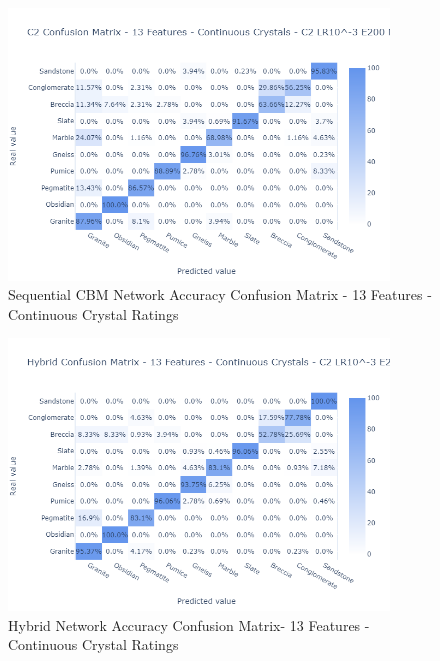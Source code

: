 \begin{figure}[H]
  \centering
    \includegraphics[width=0.9\textwidth, trim = 0cm 0cm 0.5cm 3.5cm, clip]{images/C2 Confusion Matrix - 13 Features - Continuous Crystals.png}
    \caption{Sequential CBM Network Accuracy Confusion Matrix - 13 Features - Continuous Crystal Ratings} \label{fig:Sequential CBM Network Accuracy Confusion Matrix - 13 Features - Continuous Crystal Ratings}
\end{figure}

\begin{figure}[H]
  \centering
    \includegraphics[width=0.9\textwidth, trim = 0cm 0cm 0.5cm 3.5cm, clip]{images/Hybrid Confusion Matrix - 13 Features - Continuous Crystals.png}
    \caption{Hybrid Network Accuracy Confusion Matrix- 13 Features - Continuous Crystal Ratings} \label{fig:Hybrid Network Accuracy Confusion Matrix- 13 Features - Continuous Crystal Ratings}
\end{figure}

